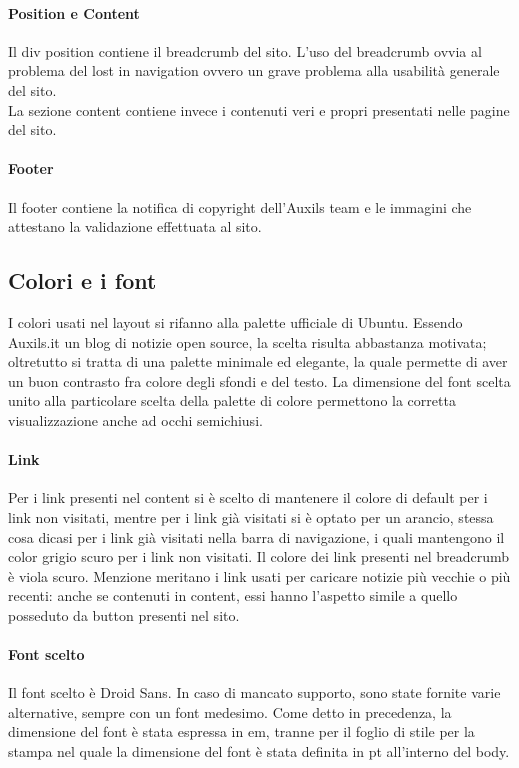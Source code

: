 \paragraph{Position e Content}
Il div position contiene il breadcrumb del sito. L'uso del breadcrumb ovvia al problema del lost in navigation ovvero un grave problema alla usabilità generale del sito.\\
La sezione content contiene invece i contenuti veri e propri presentati nelle pagine del sito.

\paragraph{Footer}
Il footer contiene la notifica di copyright dell'Auxils team e le immagini che attestano la validazione effettuata al sito.

\subsection{Colori e i font}
I colori usati nel layout si rifanno alla palette ufficiale di Ubuntu. Essendo Auxils.it un blog di notizie open source, la scelta risulta abbastanza motivata; oltretutto si tratta di una palette minimale ed elegante, la quale permette di aver un buon contrasto fra colore degli sfondi e del testo. La dimensione del font scelta unito alla particolare scelta della palette di colore permettono la corretta visualizzazione anche ad occhi semichiusi.
\paragraph{Link}
Per i link presenti nel content si è scelto di mantenere il colore di default per i link non visitati, mentre per i link già visitati si è optato per un arancio, stessa cosa dicasi per i link già visitati nella barra di navigazione, i quali mantengono il color grigio scuro per i link non visitati. Il colore dei link presenti nel breadcrumb è viola scuro. Menzione meritano i link usati per caricare notizie più vecchie o più recenti: anche se contenuti in content, essi hanno l'aspetto simile a quello posseduto da button presenti nel sito.
\paragraph{Font scelto}
Il font scelto è Droid Sans. In caso di mancato supporto, sono state fornite varie alternative, sempre con un font medesimo. Come detto in precedenza, la dimensione del font è stata espressa in em, tranne per il foglio di stile per la stampa nel quale la dimensione del font è stata definita in pt all'interno del body.

